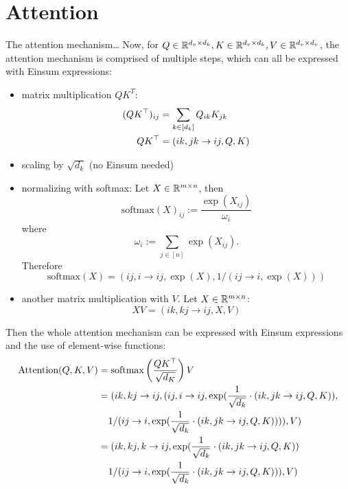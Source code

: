 \section{Attention}
The attention mechanism\dots
Now, for $Q \in \mathbb{R}^{d_v \times d_k}, K \in \mathbb{R}^{d_v \times d_k}, V \in \mathbb{R}^{d_v \times d_v}$, the attention mechanism is comprised of multiple steps, which can all be expressed with Einsum expressions:
\begin{itemize}
    \item matrix multiplication $Q K^T$:
          \begin{align*}
              (QK^\top)_{ij} & = \sum\limits_{k \in [d_k]} Q_{ik} K_{jk} \\
              QK^\top        & = (ik, jk \rightarrow ij, Q, K)
          \end{align*}
    \item scaling by $\sqrt{d_k}$ (no Einsum needed)
    \item normalizing with softmax: Let $X \in \mathbb{R}^{m \times n}$, then
          $$\text{softmax}(X)_{ij} := \frac{\exp(X_{ij})}{\omega_i}$$
          where
          $$\omega_i := \sum\limits_{j \in [n]} \exp(X_{ij}).$$
          Therefore
          $$\text{softmax}(X) = (ij, i \rightarrow ij, \exp(X), 1 / (ij \rightarrow i, \exp(X)))$$
    \item another matrix multiplication with $V$. Let $X \in \mathbb{R}^{m \times n}$:
          $$X V = (ik, kj \rightarrow ij, X, V)$$
\end{itemize}

Then the whole attention mechanism can be expressed with Einsum expressions and the use of element-wise functions:
\begin{align*}
    \text{Attention}(Q, K, V) & = \text{softmax}\left(\frac{Q K^\T}{\sqrt{d_K}}\right)V                                                          \\
                              & = (ik, kj \rightarrow ij, (ij, i \rightarrow ij, \exp(\frac{1}{\sqrt{d_k}} \cdot (ik, jk \rightarrow ij, Q, K)), \\
                              & \phantom{{}=} 1 / (ij \rightarrow i, \exp(\frac{1}{\sqrt{d_k}} \cdot (ik, jk \rightarrow ij, Q, K)))), V)        \\
                              & = (ik, kj, k \rightarrow ij, \exp(\frac{1}{\sqrt{d_k}} \cdot (ik, jk \rightarrow ij, Q, K))                      \\
                              & \phantom{{}=} 1 / (ij \rightarrow i, \exp(\frac{1}{\sqrt{d_k}} \cdot (ik, jk \rightarrow ij, Q, K))), V)
\end{align*}
